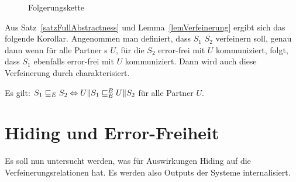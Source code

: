 \begin{figure}[h!tbp]
  \begin{center}
    \caption{Folgerungskette}
\label{Folgerungskette}
  \end{center}
\end{figure}

Aus Satz~\ref{satzFullAbstractness} und Lemma~\ref{lemVerfeinerung} ergibt sich
das folgende Korollar. Angenommen man definiert, dass $S_1$ $S_2$ verfeinern
soll, genau dann wenn für alle Partner \EIO{}s $U$, für die $S_2$ error-frei
mit $U$ kommuniziert, folgt, dass $S_1$ ebenfalls error-frei mit $U$
kommuniziert. Dann wird auch diese Verfeinerung durch \ERel{} charakterisiert.

\begin{kor}
  Es gilt: $S_1\sqsubseteq _E S_2 \Leftrightarrow U\|S_1\sqsubseteq _E^B U\|S_2$ für alle Partner
  $U$.
\end{kor}

\section{Hiding und Error-Freiheit}

Es soll nun untersucht werden, was für Auswirkungen Hiding auf die
Verfeinerungsrelationen hat. Es werden also Outputs der Systeme internalisiert.

